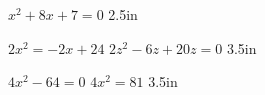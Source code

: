 {
    $ x^2 + 8x + 7 = 0$
}
{2.5in}


\myProblems
{
    $ 2x^2 = -2x + 24$
}
{
    $2z^2 -6z + 20z = 0$
}
{3.5in}


\myProblems
{
    $ 4x^2 - 64 = 0$
}
{
    $ 4x^2 = 81$
}
{3.5in}